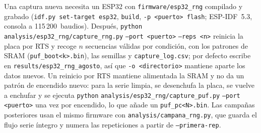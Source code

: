 Una captura nueva necesita un ESP32 con \nolinkurl{firmware/esp32_rng}
compilado y grabado (\texttt{idf.py set-target esp32}, \texttt{build},
\texttt{-p <puerto> flash}; ESP-IDF~5.3, consola a 115\,200~baudios).
Después, \texttt{python} \nolinkurl{analysis/esp32_rng/capture_rng.py}
\texttt{--port <puerto>} \texttt{--reps <n>} reinicia la placa por RTS y
recoge $n$ secuencias válidas por condición, con los patrones de SRAM
(\texttt{puf\_boot<k>.bin}), las semillas y \texttt{capture\_log.csv}; por
defecto escribe en \nolinkurl{results/esp32_rng_agosto}, así que
\texttt{-o <directorio>} mantiene aparte los datos nuevos. Un reinicio por
RTS mantiene alimentada la SRAM y no da un patrón de encendido nuevo: para
la serie limpia, se desenchufa la placa, se vuelve a enchufar y se ejecuta
\texttt{python} \nolinkurl{analysis/esp32_rng/capture_puf.py}
\texttt{--port <puerto>} una vez por encendido, lo que añade un
\texttt{puf\_pc<N>.bin}. Las campañas posteriores usan el mismo firmware
con \nolinkurl{analysis/campana_rng.py}, que guarda el flujo serie íntegro
y numera las repeticiones a partir de \texttt{--primera-rep}.
